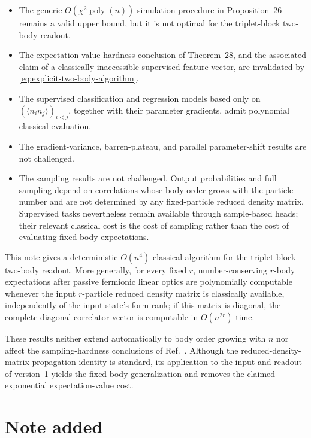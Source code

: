 \documentclass[10pt,twocolumn]{article}
\theoremstyle{plain}
\begin{document}
\begin{itemize}
\item The generic \(O(\chi^2\operatorname{poly}(n))\) simulation
procedure in Proposition~26 remains a valid upper bound, but it is not
optimal for the triplet-block two-body readout.

\item The expectation-value hardness conclusion of Theorem~28, and
the associated claim of a classically inaccessible supervised feature
vector, are invalidated by
\eqref{eq:explicit-two-body-algorithm}.

\item The supervised classification and regression models based only
on \((\langle n_i n_j\rangle)_{i<j}\), together with their parameter
gradients, admit polynomial classical evaluation.

\item The gradient-variance, barren-plateau, and parallel
parameter-shift results are not challenged.

\item The sampling results are not challenged. Output probabilities
and full sampling depend on correlations whose body order grows with
the particle number and are not determined by any fixed-particle
reduced density matrix. Supervised tasks nevertheless remain available
through sample-based heads; their relevant classical cost is the cost
of sampling rather than the cost of evaluating fixed-body
expectations.
\end{itemize}

This note gives a deterministic \(O(n^4)\) classical algorithm for the
triplet-block two-body readout. More generally, for every fixed \(r\),
number-conserving \(r\)-body expectations after passive fermionic
linear optics are polynomially computable whenever the input
\(r\)-particle reduced density matrix is classically available,
independently of the input state's form-rank; if this matrix is
diagonal, the complete diagonal correlator vector is computable in
\(O(n^{2r})\) time.

These results neither extend automatically to body order growing with
\(n\) nor affect the sampling-hardness conclusions of
Ref.~\cite{Kerenidis2026v1}. Although the reduced-density-matrix
propagation identity is standard, its application to the input and
readout of version~1 yields the fixed-body generalization and removes
the claimed exponential expectation-value cost.

\section*{Note added}
\end{document}
